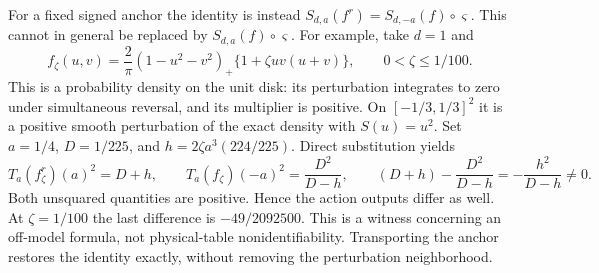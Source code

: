 \begin{remark}
\label{rem:v29-fixed-anchor-witness}
For a fixed signed anchor the identity is instead
\(S_{d,a}(f^r)=S_{d,-a}(f)\circ\varsigma\).  This cannot in general be
replaced by \(S_{d,a}(f)\circ\varsigma\).  For example, take \(d=1\) and
\[
 f_\zeta(u,v)=\frac2\pi(1-u^2-v^2)_+
                       \{1+\zeta uv(u+v)\},\qquad 0<\zeta\le1/100.
\]
This is a probability density on the unit disk: its perturbation integrates
to zero under simultaneous reversal, and its multiplier is positive.  On
\([-1/3,1/3]^2\) it is a positive smooth perturbation of the exact density
with \(S(u)=u^2\).  Set \(a=1/4\), \(D=1/225\), and
\(h=2\zeta a^3(224/225)\).  Direct substitution yields
\[
 T_a(f_\zeta^r)(a)^2=D+h,\qquad
 T_a(f_\zeta)(-a)^2=\frac{D^2}{D-h},\qquad
 (D+h)-\frac{D^2}{D-h}=-\frac{h^2}{D-h}\ne0.
\]
Both unsquared quantities are positive.  Hence the action outputs differ
as well.  At \(\zeta=1/100\) the last difference is
\(-49/2092500\).  This is a witness concerning an off-model formula, not
physical-table nonidentifiability.  Transporting the anchor restores the
identity exactly, without removing the perturbation neighborhood.
\end{remark}
